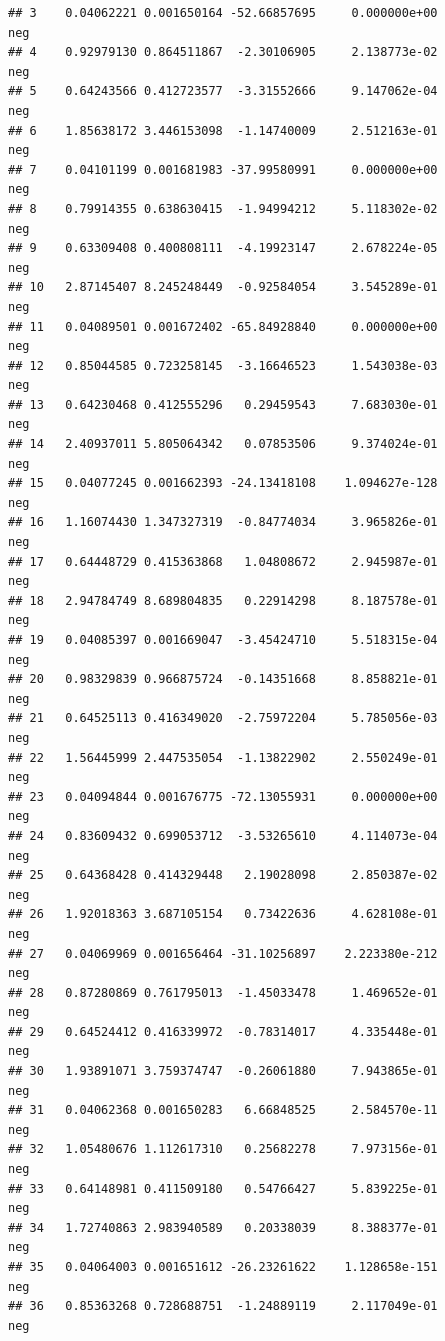 \documentclass[
]{article}
\begin{document}
\begin{verbatim}
## 3    0.04062221 0.001650164 -52.66857695     0.000000e+00              neg
## 4    0.92979130 0.864511867  -2.30106905     2.138773e-02              neg
## 5    0.64243566 0.412723577  -3.31552666     9.147062e-04              neg
## 6    1.85638172 3.446153098  -1.14740009     2.512163e-01              neg
## 7    0.04101199 0.001681983 -37.99580991     0.000000e+00              neg
## 8    0.79914355 0.638630415  -1.94994212     5.118302e-02              neg
## 9    0.63309408 0.400808111  -4.19923147     2.678224e-05              neg
## 10   2.87145407 8.245248449  -0.92584054     3.545289e-01              neg
## 11   0.04089501 0.001672402 -65.84928840     0.000000e+00              neg
## 12   0.85044585 0.723258145  -3.16646523     1.543038e-03              neg
## 13   0.64230468 0.412555296   0.29459543     7.683030e-01              neg
## 14   2.40937011 5.805064342   0.07853506     9.374024e-01              neg
## 15   0.04077245 0.001662393 -24.13418108    1.094627e-128              neg
## 16   1.16074430 1.347327319  -0.84774034     3.965826e-01              neg
## 17   0.64448729 0.415363868   1.04808672     2.945987e-01              neg
## 18   2.94784749 8.689804835   0.22914298     8.187578e-01              neg
## 19   0.04085397 0.001669047  -3.45424710     5.518315e-04              neg
## 20   0.98329839 0.966875724  -0.14351668     8.858821e-01              neg
## 21   0.64525113 0.416349020  -2.75972204     5.785056e-03              neg
## 22   1.56445999 2.447535054  -1.13822902     2.550249e-01              neg
## 23   0.04094844 0.001676775 -72.13055931     0.000000e+00              neg
## 24   0.83609432 0.699053712  -3.53265610     4.114073e-04              neg
## 25   0.64368428 0.414329448   2.19028098     2.850387e-02              neg
## 26   1.92018363 3.687105154   0.73422636     4.628108e-01              neg
## 27   0.04069969 0.001656464 -31.10256897    2.223380e-212              neg
## 28   0.87280869 0.761795013  -1.45033478     1.469652e-01              neg
## 29   0.64524412 0.416339972  -0.78314017     4.335448e-01              neg
## 30   1.93891071 3.759374747  -0.26061880     7.943865e-01              neg
## 31   0.04062368 0.001650283   6.66848525     2.584570e-11              neg
## 32   1.05480676 1.112617310   0.25682278     7.973156e-01              neg
## 33   0.64148981 0.411509180   0.54766427     5.839225e-01              neg
## 34   1.72740863 2.983940589   0.20338039     8.388377e-01              neg
## 35   0.04064003 0.001651612 -26.23261622    1.128658e-151              neg
## 36   0.85363268 0.728688751  -1.24889119     2.117049e-01              neg

\end{verbatim}
\end{document}
